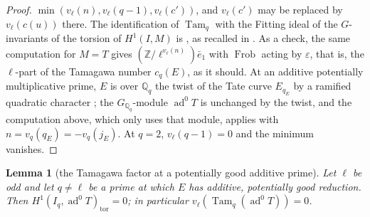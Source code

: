 \documentclass[11pt]{amsart}
\newtheorem{lemma}[theorem]{Lemma}
\theoremstyle{definition}
\newcommand{\Q}{\mathbb{Q}}
\newcommand{\Z}{\mathbb{Z}}
\newcommand{\ad}{\operatorname{ad}^0}
\newcommand{\Frob}{\operatorname{Frob}}
\newcommand{\Tam}{\operatorname{Tam}}
\begin{document}
\begin{proof}
$\min(v_\ell(n),v_\ell(q-1),v_\ell(c'))$, and $v_\ell(c')$ may be replaced by $v_\ell(c(u))$ there. The identification of $\Tam_q$ with the Fitting ideal of the $G$-invariants of the torsion of $H^1(I,M)$ is \cite[I.4.2.2]{FPR94}, as recalled in \cite[p.~708]{DFG04}. As a check, the same computation for $M=T$ gives $(\Z/\ell^{v_\ell(n)})\bar e_1$ with $\Frob$ acting by $\varepsilon$, that is, the $\ell$-part of the Tamagawa number $c_q(E)$, as it should. At an additive potentially multiplicative prime, $E$ is over $\Q_q$ the twist of the Tate curve $E_{q_E}$ by a ramified quadratic character \cite[V.5]{SilvermanATAEC}; the $G_{\Q_q}$-module $\ad T$ is unchanged by the twist, and the computation above, which only uses that module, applies with $n=v_q(q_E)=-v_q(j_E)$. At $q=2$, $v_\ell(q-1)=0$ and the minimum vanishes.
\end{proof}

\begin{lemma}[the Tamagawa factor at a potentially good additive prime]\label{lem:tamadd}
Let $\ell$ be odd and let $q\ne\ell$ be a prime at which $E$ has additive, potentially good reduction. Then $H^1(I_q,\ad T)_{\mathrm{tor}}=0$; in particular $v_\ell(\Tam_q(\ad T))=0$.
\end{lemma}
\end{document}
